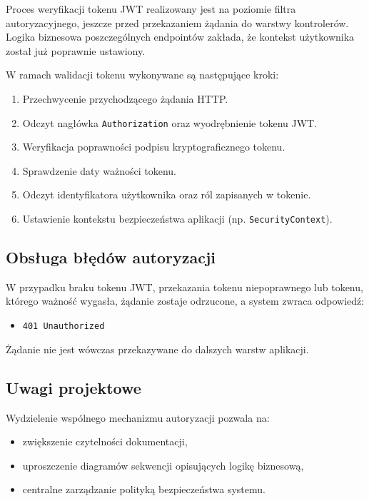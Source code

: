 \documentclass[11pt, a4paper]{article}
\begin{document}
Proces weryfikacji tokenu JWT realizowany jest na poziomie filtra
autoryzacyjnego, jeszcze przed przekazaniem żądania do warstwy kontrolerów.
Logika biznesowa poszczególnych endpointów zakłada, że kontekst użytkownika
został już poprawnie ustawiony.

W ramach walidacji tokenu wykonywane są następujące kroki:

\begin{enumerate}
    \item Przechwycenie przychodzącego żądania HTTP.
    \item Odczyt nagłówka \texttt{Authorization} oraz wyodrębnienie tokenu JWT.
    \item Weryfikacja poprawności podpisu kryptograficznego tokenu.
    \item Sprawdzenie daty ważności tokenu.
    \item Odczyt identyfikatora użytkownika oraz ról zapisanych w tokenie.
    \item Ustawienie kontekstu bezpieczeństwa aplikacji (np. \texttt{SecurityContext}).
\end{enumerate}

\subsection{Obsługa błędów autoryzacji}

W przypadku braku tokenu JWT, przekazania tokenu niepoprawnego lub tokenu,
którego ważność wygasła, żądanie zostaje odrzucone, a system zwraca odpowiedź:

\begin{itemize}
    \item \texttt{401 Unauthorized}
\end{itemize}

Żądanie nie jest wówczas przekazywane do dalszych warstw aplikacji.

\subsection{Uwagi projektowe}

Wydzielenie wspólnego mechanizmu autoryzacji pozwala na:
\begin{itemize}
    \item zwiększenie czytelności dokumentacji,
    \item uproszczenie diagramów sekwencji opisujących logikę biznesową,
    \item centralne zarządzanie polityką bezpieczeństwa systemu.
\end{itemize}
\end{document}
